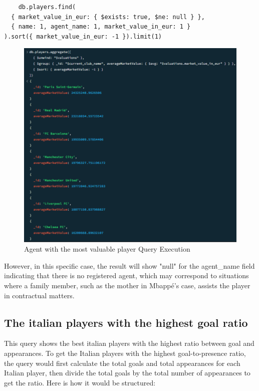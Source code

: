 \documentclass{Configuration_Files/PoliMi3i_thesis}
\begin{document}
\begin{verbatim}
    db.players.find(
  { market_value_in_eur: { $exists: true, $ne: null } },
  { name: 1, agent_name: 1, market_value_in_eur: 1 }
).sort({ market_value_in_eur: -1 }).limit(1)
\end{verbatim}
\newpage
\begin{figure}[htbp]
    \centering
    \includegraphics[scale=0.8]{Images/Queries/Average_market_value_club/amvc.png}
    \caption{Agent with the most valuable player Query Execution}
\end{figure}
However, in this specific case, the result will show "null" for the agent\_name field indicating that there is no registered agent, which may correspond to situations where a family member, such as the mother in Mbappé's case, assists the player in contractual matters.
\newpage
\subsection{The italian players with the highest goal ratio}

This query shows the best italian players with the highest ratio between goal and appearances.
To get the Italian players with the highest goal-to-presence ratio, the query would first calculate the total goals and total appearances for each Italian player, then divide the total goals by the total number of appearances to get the ratio. Here is how it would be structured:
\end{document}

